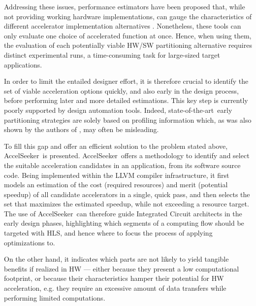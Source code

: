 \documentclass[]{usiinfthesis}
\newcommand{\aseeker}{{AccelSeeker}}
\newcommand{\SoTA}{{state-of-the-art}}
\begin{document}
Addressing these issues, performance estimators have been proposed
that, while not providing working hardware implementations, can gauge
the characteristics of different accelerator implementation
alternatives  \cite{ShaoOct16} \cite{KathailFeb16}.  
Nonetheless, these tools can only evaluate one choice of accelerated
function at once. Hence, when using them, the evaluation of each
potentially viable HW/SW partitioning alternative requires
distinct experimental runs, a time-consuming task for large-sized
target applications.\par

In order to limit the entailed designer effort, it is therefore crucial to identify the set of viable 
acceleration options quickly, and also early in the design process, before performing later and more 
detailed estimations. This key step is currently poorly supported by design automation tools. Indeed, 
\SoTA\ early partitioning strategies are solely based on profiling information \cite{XilinxESTRef18} 
\cite{LattnerMar04} which, as was also shown by the authors of \cite{SyrowikJun18}, may often be 
misleading.\par

To fill this gap and offer an efficient solution to the problem stated above, \aseeker\ is presented. 
\aseeker\ offers a methodology to identify and select the suitable acceleration candidates in an
application, from its software source code. Being implemented within the LLVM \cite{LattnerMar04} compiler 
infrastructure, it first models an estimation of the cost (required resources) and merit (potential speedup) 
of all candidate accelerators in a single, quick pass, and then selects the set that maximizes the estimated 
speedup, while not exceeding a resource target. The use of \aseeker\ can therefore guide Integrated Circuit 
architects in the early design phases, highlighting which segments of a computing flow should be
targeted with HLS, and hence where to focus the process of applying optimizations to.\par

On the other hand, it indicates which parts are not likely to yield tangible benefits if realized in HW --- either 
because they present a low computational footprint, or because their characteristics hamper their potential for HW 
acceleration, e.g. they require an excessive amount of data transfers while performing limited computations.\par
\end{document}
